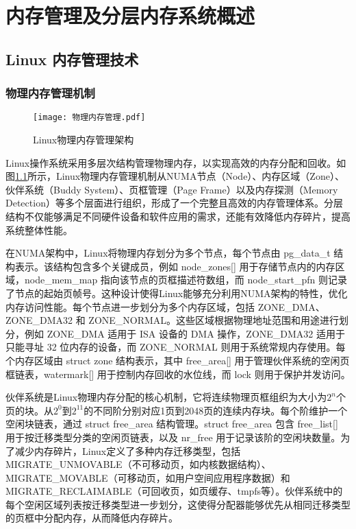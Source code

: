 \chapter{内存管理及分层内存系统概述}

\section{Linux 内存管理技术}

\subsection{物理内存管理机制}

\begin{figure}[h]
    \centering
    \texttt{[image: 物理内存管理.pdf]}
    \caption{Linux物理内存管理架构}
    \label{物理内存管理}
\end{figure}

Linux操作系统采用多层次结构管理物理内存，以实现高效的内存分配和回收。如图\ref{物理内存管理}所示，Linux物理内存管理机制从NUMA节点（Node）、内存区域（Zone）、伙伴系统（Buddy System）、页框管理（Page Frame）以及内存探测（Memory Detection）等多个层面进行组织，形成了一个完整且高效的内存管理体系。分层结构不仅能够满足不同硬件设备和软件应用的需求，还能有效降低内存碎片，提高系统整体性能。

在NUMA架构中，Linux将物理内存划分为多个节点，每个节点由 pg\_data\_t 结构表示。该结构包含多个关键成员，例如 node\_zones[] 用于存储节点内的内存区域，node\_mem\_map 指向该节点的页框描述符数组，而 node\_start\_pfn 则记录了节点的起始页帧号。这种设计使得Linux能够充分利用NUMA架构的特性，优化内存访问性能。每个节点进一步划分为多个内存区域，包括 ZONE\_DMA、ZONE\_DMA32 和 ZONE\_NORMAL。这些区域根据物理地址范围和用途进行划分，例如 ZONE\_DMA 适用于 ISA 设备的 DMA 操作，ZONE\_DMA32 适用于只能寻址 32 位内存的设备，而 ZONE\_NORMAL 则用于系统常规内存使用。每个内存区域由 struct zone 结构表示，其中 free\_area[] 用于管理伙伴系统的空闲页框链表，watermark[] 用于控制内存回收的水位线，而 lock 则用于保护并发访问。

伙伴系统是Linux物理内存分配的核心机制，它将连续物理页框组织为大小为\(2^n\)个页的块。从\(2^0\)到\(2^{11}\)的不同阶分别对应1页到2048页的连续内存块。每个阶维护一个空闲块链表，通过 struct free\_area 结构管理。struct free\_area 包含 free\_list[] 用于按迁移类型分类的空闲页链表，以及 nr\_free 用于记录该阶的空闲块数量。为了减少内存碎片，Linux定义了多种内存迁移类型，包括 MIGRATE\_UNMOVABLE（不可移动页，如内核数据结构）、MIGRATE\_MOVABLE（可移动页，如用户空间应用程序数据）和 MIGRATE\_RECLAIMABLE（可回收页，如页缓存、tmpfs等）。伙伴系统中的每个空闲区域列表按迁移类型进一步划分，这使得分配器能够优先从相同迁移类型的页框中分配内存，从而降低内存碎片。

